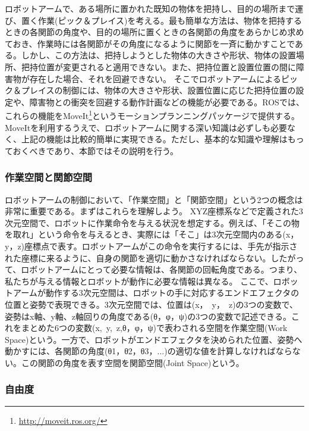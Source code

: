 ロボットアームで、ある場所に置かれた既知の物体を把持し、目的の場所まで運び、置く作業(ピック＆プレイス)を考える。最も簡単な方法は、物体を把持するときの各関節の角度や、目的の場所に置くときの各関節の角度をあらかじめ求めておき、作業時には各関節がその角度になるように関節を一斉に動かすことである。しかし、この方法は、把持しようとした物体の大きさや形状、物体の設置場所、把持位置が変更されると適用できない。また、把持位置と設置位置の間に障害物が存在した場合、それを回避できない。
そこでロボットアームによるピック＆プレイスの制御には、物体の大きさや形状、設置位置に応じた把持位置の設定や、障害物との衝突を回避する動作計画などの機能が必要である。ROSでは、これらの機能をMoveIt\footnote{\url{http://moveit.ros.org/}}というモーションプランニングパッケージで提供する。MoveItを利用するうえで、ロボットアームに関する深い知識は必ずしも必要なく、上記の機能は比較的簡単に実現できる。ただし、基本的な知識や理解はもっておくべきであり、本節ではその説明を行う。

\subsubsection{作業空間と関節空間}

ロボットアームの制御において、「作業空間」と「関節空間」という2つの概念は非常に重要である。まずはこれらを理解しよう。
XYZ座標系などで定義された3次元空間で、ロボットに作業命令を与える状況を想定する。例えば、「そこの物を取れ」という命令を与えるとき、実際には「そこ」は3次元空間内のある(x，y，z)座標点で表す。ロボットアームがこの命令を実行するには、手先が指示された座標に来るように、自身の関節を適切に動かさなければならない。したがって、ロボットアームにとって必要な情報は、各関節の回転角度である。つまり、私たちが与える情報とロボットが動作に必要な情報は異なる。
ここで、ロボットアームが動作する3次元空間は、ロボットの手に対応するエンドエフェクタの位置と姿勢で表現できる。3次元空間では、位置は(x，\ y，\ z)の3つの変数で、姿勢はx軸、y軸、z軸回りの角度である(θ，φ，ψ)の3つの変数で記述できる。これをまとめた6つの変数(x,\ y,\ z,θ，φ，ψ)で表わされる空間を作業空間(Work Space)という。一方で、ロボットがエンドエフェクタを決められた位置、姿勢へ動かすには、各関節の角度(θ1，θ2，θ3，...)の適切な値を計算しなければならない。この関節の角度を表す空間を関節空間(Joint Space)という。

\subsubsection{自由度}

